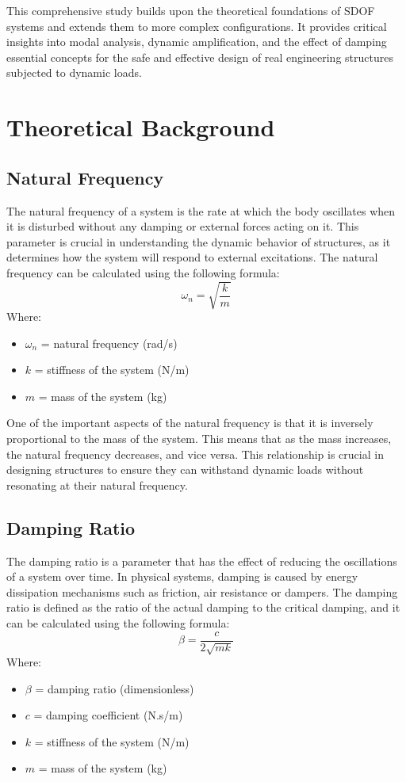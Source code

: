 \documentclass{article}  %
\begin{document}
This comprehensive study builds upon the theoretical foundations of SDOF systems and extends them to more complex configurations. It provides critical insights into modal analysis, dynamic amplification, and the effect of damping essential concepts for the safe and effective design of real engineering structures subjected to dynamic loads.

\newpage

\section{Theoretical Background}

\subsection{Natural Frequency}
The natural frequency of a system is the rate at which the body oscillates when it is disturbed without any damping or external forces acting on it. This parameter is crucial in understanding the dynamic behavior of structures, as it determines how the system will respond to external excitations. The natural frequency can be calculated using the following formula:
\begin{equation}
\omega_n = \sqrt{\frac{k}{m}}
\end{equation}
Where:
\begin{itemize}
  \item $\omega_n$ = natural frequency (rad/s)
  \item $k$ = stiffness of the system (N/m)
  \item $m$ = mass of the system (kg)
\end{itemize}

One of the important aspects of the natural frequency is that it is inversely proportional to the mass of the system. This means that as the mass increases, the natural frequency decreases, and vice versa. This relationship is crucial in designing structures to ensure they can withstand dynamic loads without resonating at their natural frequency.

\subsection{Damping Ratio}
The damping ratio is a parameter that has the effect of reducing the oscillations of a system over time. In physical systems, damping is caused by energy dissipation mechanisms such as friction, air resistance or dampers. The damping ratio is defined as the ratio of the actual damping to the critical damping, and it can be calculated using the following formula:
\begin{equation}
\beta = \frac{c}{2\sqrt{mk}}
\end{equation}
Where:
\begin{itemize}
  \item $\beta$ = damping ratio (dimensionless)
  \item $c$ = damping coefficient (N.s/m)
  \item $k$ = stiffness of the system (N/m)
  \item $m$ = mass of the system (kg)
\end{itemize}
\end{document}
